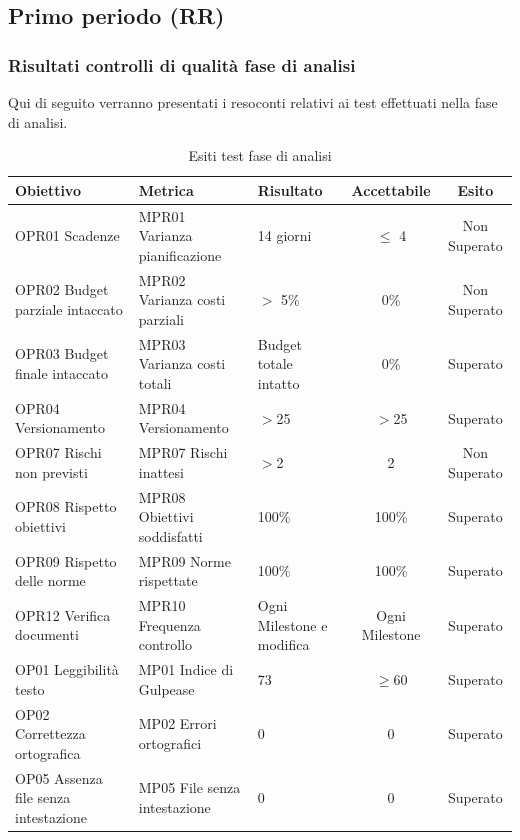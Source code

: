 \documentclass[../piano_di_qualifica.tex]{subfiles}
\begin{document}
\subsection{Primo periodo (RR)}
\label{sub:periodo-RR}
\subsubsection{Risultati controlli di qualità fase di analisi}
Qui di seguito verranno presentati i resoconti relativi ai test effettuati nella fase di analisi. \par

\begin{table}[!ht]
	\centering
	\begin{tabular}{|p{4cm}|p{4cm}|l|c|c|}
		\hline
		\rowcolor{lightgray}
		\textbf{Obiettivo}            			& \textbf{Metrica}              & \textbf{Risultato}                    & \textbf{Accettabile} & \textbf{Esito} \\
		\hline
		OPR01 Scadenze		        			& MPR01 Varianza pianificazione & 14 giorni                             & $\leq$ 4           	& Non Superato   \\
		OPR02 Budget parziale intaccato        	& MPR02 Varianza costi parziali & $>$ 5\%								& 0\%                  	& Non Superato   \\
		OPR03 Budget finale intaccato        	& MPR03 Varianza costi totali   & Budget totale intatto					& 0\%                  	& Superato       \\
		OPR04 Versionamento						& MPR04 Versionamento			& $>$25									& $>$25					& Superato		 \\
		OPR07 Rischi non previsti				& MPR07 Rischi inattesi			& $>$2									& 2						& Non Superato	 \\
		OPR08 Rispetto obiettivi      			& MPR08 Obiettivi soddisfatti   & 100\%                                 & 100\%                	& Superato       \\
		OPR09 Rispetto delle norme   			& MPR09 Norme rispettate        & 100\%                                 & 100\%                	& Superato       \\
		OPR12 Verifica documenti      			& MPR10 Frequenza controllo     & Ogni Milestone e modifica         	& Ogni Milestone       	& Superato       \\
		OP01 Leggibilità testo       			& MP01 Indice di Gulpease      	& 73                                 & \(\ge 60\)           	& Superato       \\
		OP02 Correttezza ortografica 			& MP02 Errori ortografici      	& 0                                     & 0                    	& Superato       \\
		OP05 Assenza file senza intestazione	& MP05 File senza intestazione 	& 0										& 0						& Superato		 \\
		\hline
	\end{tabular}
	\caption{Esiti test fase di analisi}
\end{table}
\end{document}
